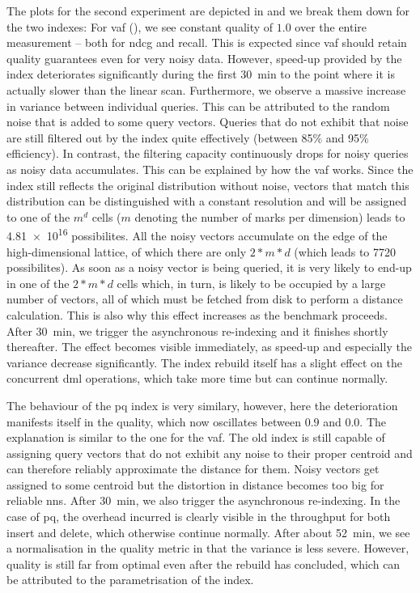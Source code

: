 The plots for the second experiment are depicted in  and we break them down for the two indexes: For \acrshort{vaf} (), we see constant quality of $1.0$ over the entire measurement -- both for \acrshort{ndcg} and recall. This is expected since \acrshort{vaf} should retain quality guarantees even for very noisy data. However, speed-up provided by the index deteriorates significantly during the first \SI{30}{\minute} to the point where it is actually slower than the linear scan. Furthermore, we observe a massive increase in variance between individual queries. This can be attributed to the random noise that is added to some query vectors. Queries that do not exhibit that noise are still filtered out by the index quite effectively (between 85\% and 95\% efficiency). In contrast, the filtering capacity continuously drops for noisy queries as noisy data accumulates. This can be explained by how the \acrshort{vaf} works. Since the index still reflects the original distribution without noise, vectors that match this distribution can be distinguished with a constant resolution and will be assigned to one of the $m^d$ cells ($m$ denoting the number of marks per dimension) leads to \SI{4.81e16}{} possibilites. All the noisy vectors accumulate on the edge of the high-dimensional lattice, of which there are only $2 * m * d$ (which leads to \SI{7720}{} possibilites). As soon as a noisy vector is being queried, it is very likely to end-up in one of the $2 * m * d$ cells which, in turn, is likely to be occupied by a large number of vectors, all of which must be fetched from disk to perform a distance calculation. This is also why this effect increases as the benchmark proceeds. After \SI{30}{\minute}, we trigger the asynchronous re-indexing and it finishes shortly thereafter. The effect becomes visible immediately, as speed-up and especially the variance decrease significantly. The index rebuild itself has a slight effect on the concurrent \acrshort{dml} operations, which take more time but can continue normally.

The behaviour of the \acrshort{pq} index is very similary, however, here the deterioration manifests itself in the quality, which now oscillates between $0.9$ and $0.0$. The explanation is similar to the one for the \acrshort{vaf}. The old index is still capable of assigning query vectors that do not exhibit any noise to their proper centroid and can therefore reliably approximate the distance for them. Noisy vectors get assigned to some centroid but the distortion in distance becomes too big for reliable \acrshort{nns}. After \SI{30}{\minute}, we also trigger the asynchronous re-indexing. In the case of \acrshort{pq}, the overhead incurred is clearly visible in the throughput for both insert and delete, which otherwise continue normally. After about \SI{52}{\minute}, we see a normalisation in the quality metric in that the variance is less severe. However, quality is still far from optimal even after the rebuild has concluded, which can be attributed to the parametrisation of the index.

